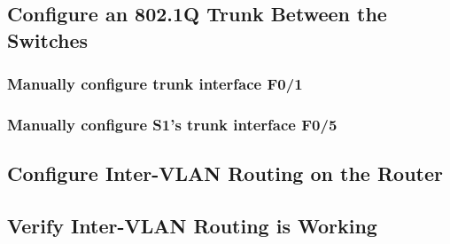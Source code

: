 \documentclass[a4paper]{article}
\begin{document}
\subsection{Configure an 802.1Q Trunk Between the Switches}



\subsubsection{Manually configure trunk interface F0/1}

\subsubsection{Manually configure S1’s trunk interface F0/5}

\subsection{Configure Inter-VLAN Routing on the Router}

\subsection{Verify Inter-VLAN Routing is Working}

\newpage
\end{document}
